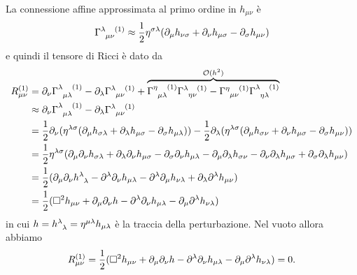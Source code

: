 La connessione affine approssimata al primo ordine in $h_{\mu\nu}$ è
\begin{equation}
  \tensor{\Gamma}{^{\lambda}_{\mu\nu}^{(1)}} \approx \frac{1}{2}\eta^{\sigma\lambda}
  (\partial_{\mu}h_{\nu\sigma} + \partial_{\nu}h_{\mu\sigma}
  - \partial_{\sigma}h_{\mu\nu})
\end{equation}
e quindi il tensore di Ricci è dato da
\begin{equation}
  \label{eq:ricci-lineare}
  \begin{split}
    R_{\mu\nu}^{(1)} &= \partial_{\nu}
    \tensor{\Gamma}{^{\lambda}_{\mu\lambda}^{(1)}}
    - \partial_{\lambda} \tensor{\Gamma}{^{\lambda}_{\mu\nu}^{(1)}} +
    \overbrace{\tensor{\Gamma}{^{\eta}_{\mu\lambda}^{(1)}}
      \tensor{\Gamma}{^{\lambda}_{\eta\nu}^{(1)}} -
      \tensor{\Gamma}{^{\eta}_{\mu\nu}^{(1)}}
      \tensor{\Gamma}{^{\lambda}_{\eta\lambda}^{(1)}}}^{\mathcal{O}(h^{2})} \\
    &\approx \partial_{\nu}\tensor{\Gamma}{^{\lambda}_{\mu\lambda}^{(1)}}
    - \partial_{\lambda} \tensor{\Gamma}{^{\lambda}_{\mu\nu}^{(1)}} \\
    &= \frac{1}{2}\partial_{\nu} (\eta^{\lambda\sigma}(\partial_{\mu}
    h_{\sigma\lambda} + \partial_{\lambda}h_{\mu\sigma}
    - \partial_{\sigma}h_{\mu\lambda})) -
    \frac{1}{2}\partial_{\lambda}(\eta^{\lambda\sigma}(\partial_{\mu}h_{\sigma\nu}
    + \partial_{\nu}h_{\mu\sigma} - \partial_{\sigma}h_{\mu\nu})) \\
    &= \frac{1}{2} \eta^{\lambda\sigma}(\partial_{\mu}\partial_{\nu}
    h_{\sigma\lambda} + \partial_{\lambda}\partial_{\nu} h_{\mu\sigma}
    - \partial_{\sigma}\partial_{\nu} h_{\mu\lambda}
    - \partial_{\mu}\partial_{\lambda} h_{\sigma\nu}
    - \partial_{\nu}\partial_{\lambda} h_{\mu\sigma}
    + \partial_{\sigma}\partial_{\lambda} h_{\mu\nu}) \\
    &= \frac{1}{2}(\partial_{\mu}\partial_{\nu}
    \tensor{h}{^{\lambda}_{\lambda}} - \partial^{\lambda}\partial_{\nu}
    h_{\mu\lambda} - \partial^{\lambda}\partial_{\mu} h_{\nu\lambda}
    + \partial_{\lambda}\partial^{\lambda} h_{\mu\nu}) \\
    &= \frac{1}{2} (\dalamb h_{\mu\nu} + \partial_{\mu}\partial_{\nu} h
    - \partial^{\lambda}\partial_{\nu} h_{\mu\lambda}
    - \partial_{\mu}\partial^{\lambda} h_{\nu\lambda})
  \end{split}
\end{equation}
in cui $h = \tensor{h}{^{\lambda}_{\lambda}} = \eta^{\mu\lambda} h_{\mu\lambda}$
è la traccia della perturbazione.  Nel vuoto allora abbiamo
\begin{equation}
  R_{\mu\nu}^{(1)} = \frac{1}{2} (\Box^{2} h_{\mu\nu}
  + \partial_{\mu}\partial_{\nu} h - \partial^{\lambda}\partial_{\nu}
  h_{\mu\lambda} - \partial_{\mu}\partial^{\lambda} h_{\nu\lambda}) = 0.
\end{equation}

